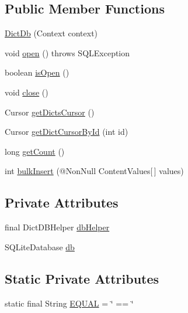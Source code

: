 \subsection*{Public Member Functions}
\begin{DoxyCompactItemize}
\item 
\hyperlink{classorg_1_1buildmlearn_1_1dictation_1_1data_1_1DictDb_ae1077faf9c7a29a3ab47ab8c855389db}{Dict\+Db} (Context context)
\item 
void \hyperlink{classorg_1_1buildmlearn_1_1dictation_1_1data_1_1DictDb_a953259b11c6f923e10194de1ff318e3f}{open} ()  throws S\+Q\+L\+Exception 
\item 
boolean \hyperlink{classorg_1_1buildmlearn_1_1dictation_1_1data_1_1DictDb_aeaf01974bc3f338db2e2bad5a78d199f}{is\+Open} ()
\item 
void \hyperlink{classorg_1_1buildmlearn_1_1dictation_1_1data_1_1DictDb_ab67c25ccc24fca6458fbc83a9d66bc05}{close} ()
\item 
Cursor \hyperlink{classorg_1_1buildmlearn_1_1dictation_1_1data_1_1DictDb_aa4871cbe065fb160ed4bf4ebab25d1ef}{get\+Dicts\+Cursor} ()
\item 
Cursor \hyperlink{classorg_1_1buildmlearn_1_1dictation_1_1data_1_1DictDb_aecbbba0d72c1e00480046ce363fe4d49}{get\+Dict\+Cursor\+By\+Id} (int id)
\item 
long \hyperlink{classorg_1_1buildmlearn_1_1dictation_1_1data_1_1DictDb_ab920f64971cc9dc5fc7cd1804807e46c}{get\+Count} ()
\item 
int \hyperlink{classorg_1_1buildmlearn_1_1dictation_1_1data_1_1DictDb_a009d94f0edc628f762b688f1166070b2}{bulk\+Insert} (@Non\+Null Content\+Values\mbox{[}$\,$\mbox{]} values)
\end{DoxyCompactItemize}
\subsection*{Private Attributes}
\begin{DoxyCompactItemize}
\item 
final Dict\+D\+B\+Helper \hyperlink{classorg_1_1buildmlearn_1_1dictation_1_1data_1_1DictDb_a3190b76f3c5b41ed1a1efd1fbb904177}{db\+Helper}
\item 
S\+Q\+Lite\+Database \hyperlink{classorg_1_1buildmlearn_1_1dictation_1_1data_1_1DictDb_a2aa3deb66d74d970b61f80add55e9c00}{db}
\end{DoxyCompactItemize}
\subsection*{Static Private Attributes}
\begin{DoxyCompactItemize}
\item 
static final String \hyperlink{classorg_1_1buildmlearn_1_1dictation_1_1data_1_1DictDb_aaad02877c23d7b290ffbee474e69790f}{E\+Q\+U\+AL} = \char`\"{} == \char`\"{}
\end{DoxyCompactItemize}


